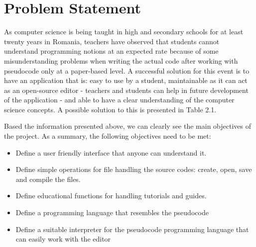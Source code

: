 \documentclass[12pt,a4paper,twoside]{report}
\begin{document}
\section{Problem Statement}
	As computer science is being taught in high and secondary schools for at least twenty years in Romania, teachers have observed that students cannot understand programming notions at an expected rate because of some misunderstanding problems when writing the actual code after working with pseudocode only at a paper-based level. A successful solution for this event is to have an application that is: easy to use by a student, maintainable as it can act as an open-source editor - teachers and students can help in future development of the application - and able to have a clear understanding of the computer science concepts. A possible solution to this is presented in Table 2.1.

\begin{table}[H]
\centering
{}
\caption{Product Position Statement}


\label{tab:my-table}
\end{table}

Based the information presented above, we can clearly see the main objectives of the project. As a summary, the following objectives need to be met:
\begin{itemize}
\item Define a user friendly interface that anyone can understand it.
\item Define simple operations for file handling the source codes: create, open, save and compile the files.
\item Define educational functions for handling tutorials and guides.
\item Define a programming language that resembles the pseudocode
\item Define a suitable interpreter for the pseudocode programming language that can easily work with the editor
\end{itemize}
\end{document}
